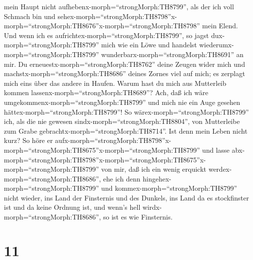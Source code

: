 mein Haupt nicht aufhebenx-morph=``strongMorph:TH8799'', als der ich
voll Schmach bin und
sehex-morph=``strongMorph:TH8798''\textbar x-morph=``strongMorph:TH8676''x-morph=``strongMorph:TH8798''
mein Elend.  Und wenn ich es
aufrichtex-morph=``strongMorph:TH8799'', so jagst
dux-morph=``strongMorph:TH8799'' mich wie ein Löwe und handelst
wiederumx-morph=``strongMorph:TH8799''
wunderbarx-morph=``strongMorph:TH8691'' an mir.  Du
erneuestx-morph=``strongMorph:TH8762'' deine Zeugen wider mich und
machstx-morph=``strongMorph:TH8686'' deines Zornes viel auf mich; es
zerplagt mich eins über das andere in Haufen.  Warum hast
du mich aus Mutterleib kommen lassenx-morph=``strongMorph:TH8689''? Ach,
daß ich wäre umgekommenx-morph=``strongMorph:TH8799'' und mich nie ein
Auge gesehen hättex-morph=``strongMorph:TH8799''!  So
wärex-morph=``strongMorph:TH8799'' ich, als die nie gewesen
sindx-morph=``strongMorph:TH8804'', von Mutterleibe zum Grabe
gebrachtx-morph=``strongMorph:TH8714''.  Ist denn mein
Leben nicht kurz? So höre er
aufx-morph=``strongMorph:TH8798''\textbar x-morph=``strongMorph:TH8675''x-morph=``strongMorph:TH8799''
und lasse
abx-morph=``strongMorph:TH8798''\textbar x-morph=``strongMorph:TH8675''x-morph=``strongMorph:TH8799''
von mir, daß ich ein wenig erquickt werdex-morph=``strongMorph:TH8686'',
 ehe ich denn hingehex-morph=``strongMorph:TH8799'' und
kommex-morph=``strongMorph:TH8799'' nicht wieder, ins Land der
Finsternis und des Dunkels,  ins Land da es stockfinster
ist und da keine Ordnung ist, und wenn's hell
wirdx-morph=``strongMorph:TH8686'', so ist es wie Finsternis.

\hypertarget{section-10}{%
\section{11}\label{section-10}}

